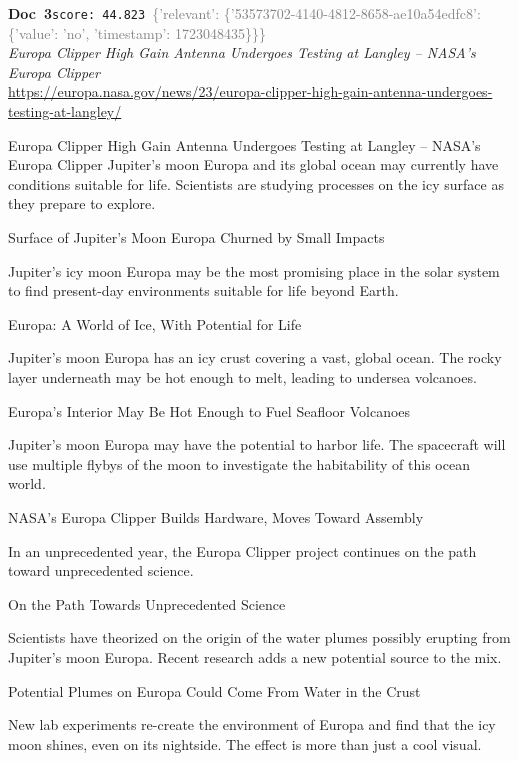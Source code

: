\documentclass[a4paper,11pt]{article}
\begin{document}
\begin{docenv}
{\footnotesize\textcolor{doccolor}{\textbf{Doc~3}}}\hfill{\tiny\texttt{score:~44.823}}\ {\tiny\textcolor{gray}{\{'relevant': \{'53573702-4140-4812-8658-ae10a54edfc8': \{'value': 'no', 'timestamp': 1723048435\}\}\}}}\\[3pt]
{\small\textit{Europa Clipper High Gain Antenna Undergoes Testing at Langley – NASA's Europa Clipper}}\\[2pt]
{\tiny\url{https://europa.nasa.gov/news/23/europa-clipper-high-gain-antenna-undergoes-testing-at-langley/}}\\[4pt]
{\footnotesize Europa Clipper High Gain Antenna Undergoes Testing at Langley – NASA's Europa Clipper
Jupiter’s moon Europa and its global ocean may currently have conditions suitable for life. Scientists are studying processes on the icy surface as they prepare to explore.

Surface of Jupiter's Moon Europa Churned by Small Impacts

Jupiter’s icy moon Europa may be the most promising place in the solar system to find present-day environments suitable for life beyond Earth. 

Europa: A World of Ice, With Potential for Life

Jupiter’s moon Europa has an icy crust covering a vast, global ocean. The rocky layer underneath may be hot enough to melt, leading to undersea volcanoes.

Europa's Interior May Be Hot Enough to Fuel Seafloor Volcanoes

Jupiter’s moon Europa may have the potential to harbor life. The spacecraft will use multiple flybys of the moon to investigate the habitability of this ocean world.

NASA's Europa Clipper Builds Hardware, Moves Toward Assembly

In an unprecedented year, the Europa Clipper project continues on the path toward unprecedented science. 

On the Path Towards Unprecedented Science

Scientists have theorized on the origin of the water plumes possibly erupting from Jupiter's moon Europa. Recent research adds a new potential source to the mix.

Potential Plumes on Europa Could Come From Water in the Crust

New lab experiments re-create the environment of Europa and find that the icy moon shines, even on its nightside. The effect is more than just a cool visual.

}
\end{docenv}
\end{document}
